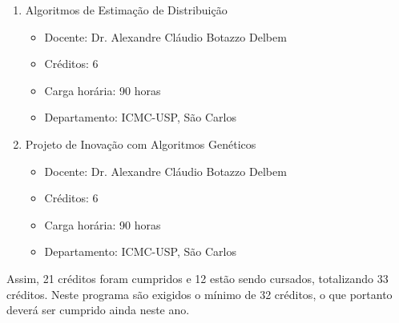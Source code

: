 \begin{enumerate}
	\item Algoritmos de Estimação de Distribuição
	\begin{itemize}
		\item Docente: Dr. Alexandre Cláudio Botazzo Delbem
		\item Créditos: 6
		\item Carga horária: 90 horas
		\item Departamento: ICMC-USP, São Carlos
	\end{itemize}
	\item Projeto de Inovação com Algoritmos Genéticos
	\begin{itemize}
		\item Docente: Dr. Alexandre Cláudio Botazzo Delbem
		\item Créditos: 6
		\item Carga horária: 90 horas
		\item Departamento: ICMC-USP, São Carlos
	\end{itemize}
\end{enumerate}

Assim, 21 créditos foram cumpridos e 12 estão sendo cursados, totalizando 33 créditos. Neste programa são exigidos o mínimo de 32 créditos, o que portanto deverá ser cumprido ainda neste ano. 